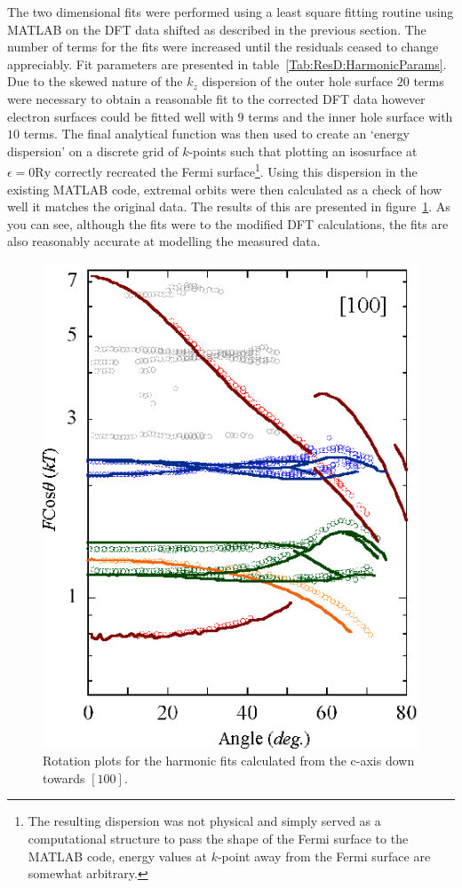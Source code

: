 The two dimensional fits were performed using a least square fitting routine using MATLAB on the \ac{DFT} data shifted as described in the previous section. The number of terms for the fits were increased until the residuals ceased to change appreciably. Fit parameters are presented in table~\ref{Tab:ResD:HarmonicParams}. Due to the skewed nature of the $k_z$ dispersion of the outer hole surface $20$ terms were necessary to obtain a reasonable fit to the corrected \ac{DFT} data however electron surfaces could be fitted well with $9$ terms and the inner hole surface with $10$ terms.  The final analytical function was then used to create an `energy dispersion' on a discrete grid of $k$-points such that plotting an isosurface at $\epsilon = \unit{0}{\textrm{Ry}}$ correctly recreated the Fermi surface\footnote{The resulting dispersion was not physical and simply served as a computational structure to pass the shape of the Fermi surface to the MATLAB code, energy values at $k$-point away from the Fermi surface are somewhat arbitrary.}. Using this dispersion in the existing MATLAB code, extremal orbits were then calculated as a check of how well it matches the original data. The results of this are presented in figure~\ref{Fig:ResD:TightBindingFitRotationPlot}. As you can see, although the fits were to the modified \ac{DFT} calculations, the fits are also reasonably accurate at modelling the measured data.
\begin{figure}[htbp]
    \begin{center}
        \includegraphics[scale=0.9]{Chapter-dHvABaFe2P2/Figures/AngleDepMeasurements/TightBindingFits/TightBindingFits}
        \caption{Rotation plots for the harmonic fits calculated from the c-axis down towards $[100]$.}
        \label{Fig:ResD:TightBindingFitRotationPlot}
    \end{center}
\end{figure}
